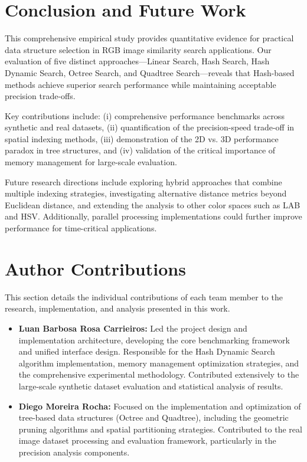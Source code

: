 \documentclass{sbc2023}
\begin{document}
\begin{table}[H]
\section{Conclusion and Future Work}
\label{sec:conclusion}

This comprehensive empirical study provides quantitative evidence for practical data structure selection in RGB image similarity search applications. Our evaluation of five distinct approaches—Linear Search, Hash Search, Hash Dynamic Search, Octree Search, and Quadtree Search—reveals that Hash-based methods achieve superior search performance while maintaining acceptable precision trade-offs.

Key contributions include: (i) comprehensive performance benchmarks across synthetic and real datasets, (ii) quantification of the precision-speed trade-off in spatial indexing methods, (iii) demonstration of the 2D vs. 3D performance paradox in tree structures, and (iv) validation of the critical importance of memory management for large-scale evaluation.

Future research directions include exploring hybrid approaches that combine multiple indexing strategies, investigating alternative distance metrics beyond Euclidean distance, and extending the analysis to other color spaces such as LAB and HSV. Additionally, parallel processing implementations could further improve performance for time-critical applications.

\section*{Author Contributions}
\label{sec:contributions}

This section details the individual contributions of each team member to the research, implementation, and analysis presented in this work.

\begin{itemize}
    \item \textbf{Luan Barbosa Rosa Carrieiros:} Led the project design and implementation architecture, developing the core benchmarking framework and unified interface design. Responsible for the Hash Dynamic Search algorithm implementation, memory management optimization strategies, and the comprehensive experimental methodology. Contributed extensively to the large-scale synthetic dataset evaluation and statistical analysis of results.
    
    \item \textbf{Diego Moreira Rocha:} Focused on the implementation and optimization of tree-based data structures (Octree and Quadtree), including the geometric pruning algorithms and spatial partitioning strategies. Contributed to the real image dataset processing and evaluation framework, particularly in the precision analysis components.
    

\end{itemize}
\end{table}
\end{document}
